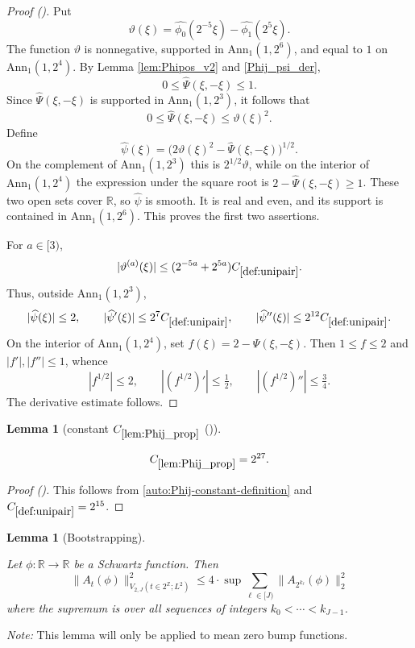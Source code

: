 \documentclass[12pt,reqno]{amsart}
\newcommand{\auto}{{({\tiny\faCar})}}
\theoremstyle{plain}
\newtheorem{lemma}[theorem]{Lemma}
\numberwithin{equation}{section}
\theoremstyle{remark}
\newcommand{\uses}[1]{}
\newcommand{\usesdefs}[1]{}
\newcommand{\leanok}{}
\newcommand{\lean}[1]{}
\newcommand{\Z}{{\mathbb Z}}
\newcommand{\R}{{\mathbb R}}
\begin{document}
\begin{proof}[Proof \auto]
Put
\[
\vartheta(\xi)=\widehat{\phi_0}(2^{-5}\xi)-\widehat{\phi_1}(2^5\xi).
\]
The function $\vartheta$ is nonnegative, supported in $\mathrm{Ann}_1(1,2^6)$, and equal to $1$ on $\mathrm{Ann}_1(1,2^4)$. By Lemma \ref{lem:Phipos_v2} and \eqref{Phij_psi_der},
\[
0\le\widehat\Psi(\xi,-\xi)\le1.
\]
Since $\widehat\Psi(\xi,-\xi)$ is supported in $\mathrm{Ann}_1(1,2^3)$, it follows that
\begin{equation}\label{eqn:lemPhij_proppf}
0\le\widehat\Psi(\xi,-\xi)\le\vartheta(\xi)^2.
\end{equation}
Define
\begin{equation}\label{def_sqrtpsi}
\widehat\psi(\xi)=\bigl(2\vartheta(\xi)^2-\widehat\Psi(\xi,-\xi)\bigr)^{1/2}.
\end{equation}
On the complement of $\mathrm{Ann}_1(1,2^3)$ this is $2^{1/2}\vartheta$, while on the interior of $\mathrm{Ann}_1(1,2^4)$ the expression under the square root is $2-\widehat\Psi(\xi,-\xi)\ge1$. These two open sets cover $\R$, so $\widehat\psi$ is smooth. It is real and even, and its support is contained in $\mathrm{Ann}_1(1,2^6)$. This proves the first two assertions.

For $a\in[3)$,
\[
|\vartheta^{(a)}(\xi)|
\le (2^{-5a}+2^{5a})C_{\ref{def:unipair}}.
\]
Thus, outside $\mathrm{Ann}_1(1,2^3)$,
\[
|\widehat\psi(\xi)|\le2,
\qquad
|\widehat\psi'(\xi)|\le2^7C_{\ref{def:unipair}},
\qquad
|\widehat\psi''(\xi)|\le2^{12}C_{\ref{def:unipair}}.
\]
On the interior of $\mathrm{Ann}_1(1,2^4)$, set $f(\xi)=2-\widehat\Psi(\xi,-\xi)$. Then $1\le f\le2$ and $|f'|,|f''|\le1$, whence
\[
|f^{1/2}|\le2,
\qquad
|(f^{1/2})'|\le\tfrac12,
\qquad
|(f^{1/2})''|\le\tfrac34.
\]
The derivative estimate follows.
\end{proof}

\begin{lemma}[constant $C_{\ref{lem:Phij_prop}}$ \auto]\label{constant Phij proposition}\uses{lem:Phij_prop}\usesdefs{def:unipair}
\lean{Auto.constantPhiJProposition}
\leanok
\begin{equation}\label{constant Phij proposition bound}
C_{\ref{lem:Phij_prop}}=2^{27}.
\end{equation}
\end{lemma}
\begin{proof}[Proof \auto]
This follows from \eqref{auto:Phij-constant-definition} and $C_{\ref{def:unipair}}=2^{15}$.
\end{proof}


\begin{lemma}[Bootstrapping]
\label{lem:bootstrap}\uses{}\usesdefs{A_def}
\lean{Auto.bootstrap}
\leanok
Let $\phi:\R\to \R$ be a Schwartz function.
Then
    \begin{equation}\label{auto:dyadic-variation-bootstrap}\|A_{t}(\phi)\|^2_{V_{2,J}(t\in 2^{\Z}; L^2)} \le  4 \cdot \sup \sum_{\ell\in [J)} \|A_{2^{k_{\ell}}}(\phi)\|^2_2     \end{equation}
    where the supremum is over all sequences of integers $k_0<\cdots <k_{J-1}$.
\end{lemma}
{\em Note:} This lemma will only be applied to mean zero bump functions.
\end{document}
